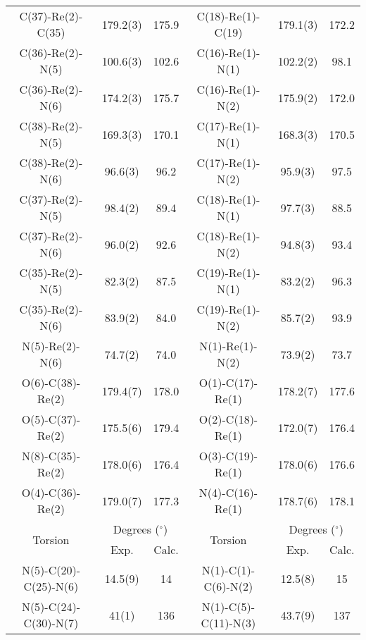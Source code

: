 \begin{table}[htbp]
{\begin{tabular}{cccccc}
    C(37)-Re(2)-C(35) & 179.2(3) & 175.9 & C(18)-Re(1)-C(19) & 179.1(3) & 172.2 \\
    C(36)-Re(2)-N(5) & 100.6(3) & 102.6 & C(16)-Re(1)-N(1) & 102.2(2) & 98.1 \\
    C(36)-Re(2)-N(6) & 174.2(3) & 175.7 & C(16)-Re(1)-N(2) & 175.9(2) & 172.0 \\
    C(38)-Re(2)-N(5) & 169.3(3) & 170.1 & C(17)-Re(1)-N(1) & 168.3(3) & 170.5 \\
    C(38)-Re(2)-N(6) & 96.6(3) & 96.2 & C(17)-Re(1)-N(2) & 95.9(3) & 97.5 \\
    C(37)-Re(2)-N(5) & 98.4(2) & 89.4 & C(18)-Re(1)-N(1) & 97.7(3) & 88.5 \\
    C(37)-Re(2)-N(6) & 96.0(2) & 92.6 & C(18)-Re(1)-N(2) & 94.8(3) & 93.4 \\
    C(35)-Re(2)-N(5) & 82.3(2) & 87.5 & C(19)-Re(1)-N(1) & 83.2(2) & 96.3 \\
    C(35)-Re(2)-N(6) & 83.9(2) & 84.0 & C(19)-Re(1)-N(2) & 85.7(2) & 93.9 \\
    N(5)-Re(2)-N(6) & 74.7(2) & 74.0 & N(1)-Re(1)-N(2) & 73.9(2) & 73.7 \\
    O(6)-C(38)-Re(2) & 179.4(7) & 178.0 & O(1)-C(17)-Re(1) & 178.2(7) & 177.6 \\
    O(5)-C(37)-Re(2) & 175.5(6) & 179.4 & O(2)-C(18)-Re(1) & 172.0(7) & 176.4 \\ 
    N(8)-C(35)-Re(2) & 178.0(6) & 176.4 & O(3)-C(19)-Re(1) & 178.0(6) & 176.6 \\
    O(4)-C(36)-Re(2) & 179.0(7) & 177.3 & N(4)-C(16)-Re(1) & 178.7(6) & 178.1 \\ \midrule
    \multirow{2}{*}{Torsion} & \multicolumn{2}{c}{Degrees ($^\circ$)} & \multirow{2}{*}{Torsion} & \multicolumn{2}{c}{Degrees ($^\circ$)} \\ \cline{2-3} \cline {5-6}
     & Exp. & Calc. & & Exp. & Calc. \\ \midrule
    N(5)-C(20)-C(25)-N(6) & 14.5(9) & 14 & N(1)-C(1)-C(6)-N(2) & 12.5(8) & 15 \\
    N(5)-C(24)-C(30)-N(7) & 41(1) & 136 & N(1)-C(5)-C(11)-N(3) & 43.7(9) & 137 \\
    \bottomrule
    \end{tabular}}%
  \label{tab.da5}%
\end{table}%


